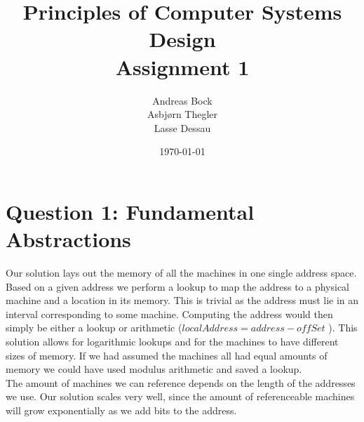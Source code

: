 \documentclass[11pt]{article}
\def\Author{Andreas Bock\\
Asbj\o rn Thegler\\
Lasse Dessau
}
\def\Title{\bf Principles of Computer Systems Design\\ {\Large Assignment 1}}
\begin{document}
\title{\Title}
\author{\Author}
\date{\today}
\maketitle

\section*{Question 1: Fundamental Abstractions}




Our solution lays out the memory of all the machines in one single address space.
Based on a given address we perform a lookup to map the address to a physical
machine and a location in its memory. This is trivial as the address must lie 
in an interval corresponding to some machine. Computing the address would
then simply be either a lookup or arithmetic ($ localAddress = address - offSet$ ).
This solution allows for logarithmic lookups and for the machines to
have different sizes of memory. If we had assumed the machines all had equal amounts
of memory we could have used modulus arithmetic and saved a lookup.\\

%


The amount of machines we can reference depends on the
length of the addresses we use. Our solution scales very well, since the amount of
referenceable machines will grow exponentially as we add bits to the address.\\
\end{document}
